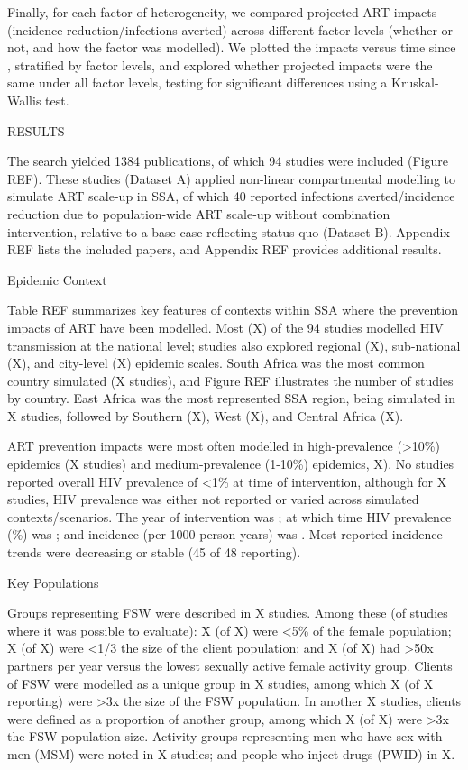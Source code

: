 Finally, for each factor of heterogeneity,
we compared projected ART impacts (incidence reduction/infections averted)
across different factor levels (whether or not, and how the factor was modelled).
We plotted the impacts versus time since , stratified by factor levels,
and explored whether projected impacts were the same under all factor levels,
testing for significant differences using a Kruskal-Wallis test.

RESULTS

The search yielded 1384 publications,
of which 94 studies were included (Figure REF).
These studies (Dataset A) applied non-linear compartmental modelling to simulate ART scale-up in SSA,
of which 40 reported infections averted/incidence reduction
due to population-wide ART scale-up without combination intervention,
relative to a base-case reflecting status quo (Dataset B).
Appendix REF lists the included papers, and
Appendix REF provides additional results.

Epidemic Context

Table REF summarizes key features of contexts within SSA
where the prevention impacts of ART have been modelled.
Most (X) of the 94 studies modelled HIV transmission at the national level;
studies also explored
regional (X),
sub-national (X), and
city-level (X) epidemic scales.
South Africa was the most common country simulated (X studies), and
Figure REF illustrates the number of studies by country.
East Africa was the most represented SSA region, being simulated in X studies,
followed by Southern (X), West (X), and Central Africa (X).

ART prevention impacts were most often modelled in
high-prevalence ({>10\%}) epidemics (X studies) and
medium-prevalence ({1-10\%}) epidemics, X).
No studies reported overall HIV prevalence of {<1\%} at time of intervention,
although for X studies, HIV prevalence was either
not reported or varied across simulated contexts/scenarios.
The \xdmdef year of intervention was ; at which time
HIV prevalence (\%) was ; and
incidence (per 1000 person-years) was .
Most reported incidence trends were decreasing or stable (45 of 48 reporting). 

Key Populations

Groups representing FSW were described in X studies.
Among these (of studies where it was possible to evaluate):
X (of X) were {<5\%} of the female population;
X (of X) were {<1/3} the size of the client population; and
X (of X) had {>50x} partners per year versus
the lowest sexually active female activity group.
Clients of FSW were modelled as a unique group in X studies,
among which X (of X reporting)
were {>3x} the size of the FSW population.
In another X studies, clients were defined as a proportion of another group,
among which X (of X)
were {>3x} the FSW population size.
Activity groups representing
men who have sex with men (MSM) were noted in X studies; and
people who inject drugs (PWID) in X.

